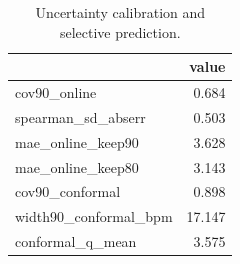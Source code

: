 \begin{table}
\caption{Uncertainty calibration and selective prediction.}
\label{tab:ppg_uncertainty}
\begin{tabular}{lr}
\toprule
 & value \\
\midrule
cov90_online & 0.684 \\
spearman_sd_abserr & 0.503 \\
mae_online_keep90 & 3.628 \\
mae_online_keep80 & 3.143 \\
cov90_conformal & 0.898 \\
width90_conformal_bpm & 17.147 \\
conformal_q_mean & 3.575 \\
\bottomrule
\end{tabular}
\end{table}
